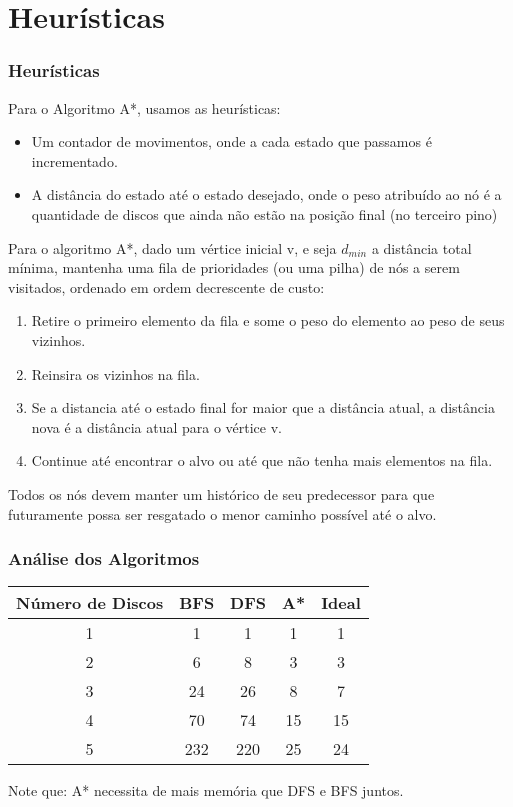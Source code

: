 \documentclass[10pt,portuguese,notheorems,compress]{beamer}
\begin{document}
\section{Heurísticas}
\begin{frame}
\frametitle{Heurísticas}
Para o Algoritmo A*, usamos as heurísticas:
\begin{itemize}
\item Um contador de movimentos, onde a cada estado que passamos é incrementado.
\item A distância do estado até o estado desejado, onde o peso atribuído ao nó é a quantidade de discos que ainda não estão na posição final (no terceiro pino)
\end{itemize}
\end{frame}

\begin{frame}
Para o algoritmo A*, dado um vértice inicial v, e seja $d_{min}$ a distância total mínima, mantenha uma fila de prioridades (ou uma pilha) de nós a serem visitados, ordenado em ordem decrescente de custo:
\begin{enumerate}
\item Retire o primeiro elemento da fila e some o peso do elemento ao peso de seus vizinhos.
\item Reinsira os vizinhos na fila.
\item Se a distancia até o estado final for maior que a distância atual, a distância nova é a distância atual para o vértice v.
\item Continue até encontrar o alvo ou até que não tenha mais elementos na fila.
\end{enumerate}
Todos os nós devem manter um histórico de seu predecessor para que futuramente possa ser resgatado o menor caminho possível até o alvo.
\end{frame}
\begin{frame}
\frametitle{Análise dos Algoritmos}
\begin{center}
\begin{table}[H]
\begin{tabular}{|c|c|c|c|c|}
\textbf{Número de Discos} & \textbf{BFS} & \textbf{DFS} & \textbf{A*} & \textbf{Ideal} \\
\hline
1 & 1 & 1 & 1 & 1 \\
2 & 6 & 8 & 3 & 3 \\
3 & 24 & 26 & 8 & 7\\
4 & 70 & 74 & 15 & 15\\
5 & 232 & 220 & 25 & 24\\
\end{tabular}
\end{table}
\end{center}
Note que: A* necessita de mais memória que DFS e BFS juntos.
\end{frame}
\end{document}
